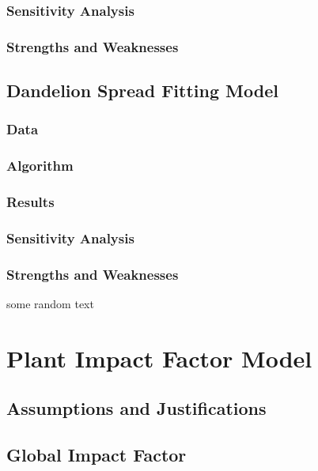 \documentclass[12pt]{article}
\begin{document}
		\subsubsection{Sensitivity Analysis}
		
		\subsubsection{Strengths and Weaknesses}
		
	\subsection{Dandelion Spread Fitting Model}
		
		\subsubsection{Data}
		
		\subsubsection{Algorithm}
		
		\subsubsection{Results}
		
		\subsubsection{Sensitivity Analysis}
		
		\subsubsection{Strengths and Weaknesses}
	
		some random text
		
\section{Plant Impact Factor Model}

	\subsection{Assumptions and Justifications}
	
	\subsection{Global Impact Factor}
		
\end{document}
